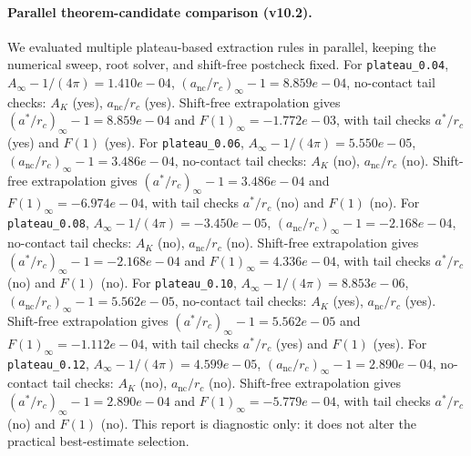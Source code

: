 \paragraph{Parallel theorem-candidate comparison (v10.2).}
We evaluated multiple plateau-based extraction rules in parallel, keeping the numerical sweep, root solver, and shift-free postcheck fixed. For \texttt{plateau_0.04}, $A_\infty-1/(4\pi)=1.410e-04$, $(a_{\mathrm{nc}}/r_c)_\infty-1=8.859e-04$, no-contact tail checks: $A_K$ (yes), $a_{\mathrm{nc}}/r_c$ (yes). Shift-free extrapolation gives $(a^*/r_c)_\infty-1=8.859e-04$ and $F(1)_\infty=-1.772e-03$, with tail checks $a^*/r_c$ (yes) and $F(1)$ (yes). For \texttt{plateau_0.06}, $A_\infty-1/(4\pi)=5.550e-05$, $(a_{\mathrm{nc}}/r_c)_\infty-1=3.486e-04$, no-contact tail checks: $A_K$ (no), $a_{\mathrm{nc}}/r_c$ (no). Shift-free extrapolation gives $(a^*/r_c)_\infty-1=3.486e-04$ and $F(1)_\infty=-6.974e-04$, with tail checks $a^*/r_c$ (no) and $F(1)$ (no). For \texttt{plateau_0.08}, $A_\infty-1/(4\pi)=-3.450e-05$, $(a_{\mathrm{nc}}/r_c)_\infty-1=-2.168e-04$, no-contact tail checks: $A_K$ (no), $a_{\mathrm{nc}}/r_c$ (no). Shift-free extrapolation gives $(a^*/r_c)_\infty-1=-2.168e-04$ and $F(1)_\infty=4.336e-04$, with tail checks $a^*/r_c$ (no) and $F(1)$ (no). For \texttt{plateau_0.10}, $A_\infty-1/(4\pi)=8.853e-06$, $(a_{\mathrm{nc}}/r_c)_\infty-1=5.562e-05$, no-contact tail checks: $A_K$ (yes), $a_{\mathrm{nc}}/r_c$ (yes). Shift-free extrapolation gives $(a^*/r_c)_\infty-1=5.562e-05$ and $F(1)_\infty=-1.112e-04$, with tail checks $a^*/r_c$ (yes) and $F(1)$ (yes). For \texttt{plateau_0.12}, $A_\infty-1/(4\pi)=4.599e-05$, $(a_{\mathrm{nc}}/r_c)_\infty-1=2.890e-04$, no-contact tail checks: $A_K$ (no), $a_{\mathrm{nc}}/r_c$ (no). Shift-free extrapolation gives $(a^*/r_c)_\infty-1=2.890e-04$ and $F(1)_\infty=-5.779e-04$, with tail checks $a^*/r_c$ (no) and $F(1)$ (no). This report is diagnostic only: it does not alter the practical best-estimate selection.
